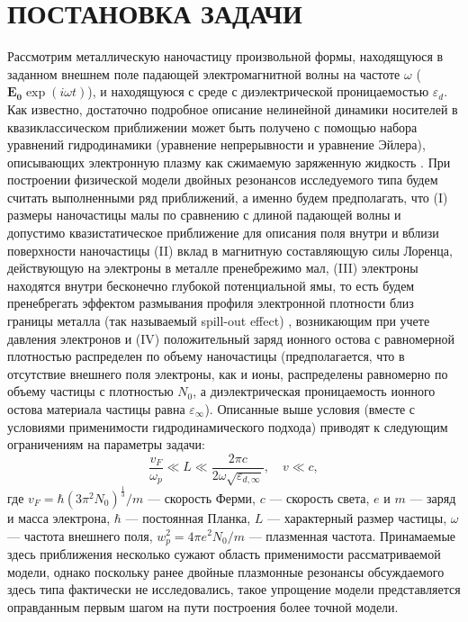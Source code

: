 \documentclass[12pt, a4paper]{article}
\renewcommand{\vec}{\mathbf}
\def \eps {\varepsilon}
\def \w {\omega}
\begin{document}
\section{ПОСТАНОВКА ЗАДАЧИ}

Рассмотрим металлическую наночастицу произвольной формы, находящуюся в заданном внешнем поле падающей электромагнитной волны на частоте $\w$ ($\vec{E_0}\exp(i\w t)$), и находящуюся с среде с диэлектрической проницаемостью $\eps_d$. Как известно, достаточно подробное описание нелинейной динамики носителей в квазиклассическом приближении может быть получено с помощью набора уравнений гидродинамики (уравнение непрерывности и уравнение Эйлера), описывающих электронную плазму как сжимаемую заряженную жидкость  %
\cite{Boardman1982, Forstmann1986,Sipe1980,David2011}. 
При построении физической модели двойных резонансов исследуемого типа будем считать выполненными ряд приближений, а именно будем предполагать, что (I) размеры наночастицы малы по сравнению с длиной падающей волны и допустимо квазистатическое приближение для описания поля внутри и вблизи поверхности наночастицы (II) вклад в магнитную составляющую силы Лоренца, действующую на электроны в металле пренебрежимо мал, (III) электроны находятся внутри бесконечно глубокой потенциальной ямы, то есть будем пренебрегать эффектом размывания профиля электронной плотности близ границы металла (так называемый spill-out effect) \cite{Takeuchi2022}, возникающим при учете давления электронов и (IV) положительный заряд ионного остова с равномерной плотностью распределен по объему наночастицы (предполагается, что в отсутствие внешнего поля электроны, как и ионы, распределены равномерно по объему частицы с плотностью $N_0$, а диэлектрическая проницаемость ионного остова материала частицы равна $\eps_\infty$). Описанные выше условия (вместе с условиями применимости гидродинамического подхода) приводят к следующим ограничениям на параметры задачи: 
\begin{equation} 	
\frac{v_F}{\omega_p} \ll L \ll \frac{2\pi c}{2\omega\sqrt{\eps_{d, \infty}}},  \quad v \ll c, 
\end{equation} 
где $v_F = \hbar (3 \pi^2 N_0)^\frac{1}{3}/m $ — скорость Ферми, $c$ — скорость света, $e$ и $m$ — заряд и масса электрона, $\hbar$ — постоянная Планка, $L$ — характерный размер частицы, $\w$ — частота внешнего поля, $ w_p^2 = 4 \pi e^2 N_0 / m$  — плазменная частота. Принамаемые здесь приближения несколько сужают область применимости рассматриваемой модели, однако поскольку ранее двойные плазмонные резонансы обсуждаемого здесь типа фактически не исследовались, такое упрощение модели представляется оправданным первым шагом на пути построения более точной модели. 
\end{document}
